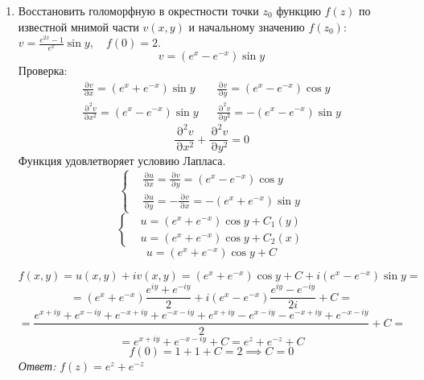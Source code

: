 \documentclass[14pt, a4paper, titlepage, fleqn]{extarticle}
\newcommand{\otv}{\textit{Ответ:} }
\DeclareMathOperator{\D}{\partial}
\begin{document}
\begin{enumerate}
        \item Восстановить голоморфную в окрестности точки \( z_0 \) функцию \( f(z) \) по известной
        мнимой части \( v(x,y) \) и начальному значению \( f(z_0) \): 
        \( 
            \displaystyle
            v = \frac{e^{2x}-1}{e^x}\sin{y}, \quad f(0) = 2
        \).
        \[ v = \left( e^x - e^{-x} \right) \sin y \]
        Проверка:
        \[
            \begin{matrix}
                \frac{\D v}{\D x} = \left( e^{x} + e^{-x} \right) \sin y &&
                \frac{\D v}{\D y} = \left( e^{x} - e^{-x} \right) \cos y \\
                \frac{\D^2 v}{\D x^2} = \left( e^{x} - e^{-x} \right) \sin y && 
                \frac{\D^2 v}{\D y^2} = -\left( e^{x} - e^{-x} \right) \sin y
            \end{matrix}
        \]
        \[
            \frac{\D^2 v}{\D x^2} + \frac{\D^2 v}{\D y^2} = 0
        \]
        Функция удовлетворяет условию Лапласа. 
        \[
            \left\lbrace
            \begin{aligned}
                &\frac{\D u}{\D x} = \frac{\D v}{\D y} = \left( e^{x} - e^{-x} \right) \cos y \\
                &\frac{\D u}{\D y} = -\frac{\D v}{\D x} = - \left( e^{x} + e^{-x} \right) \sin y
            \end{aligned}   
            \right.
        \]
        \[
            \left\lbrace
            \begin{aligned}
                &u = \left( e^{x} + e^{-x} \right) \cos y + C_1(y) \\
                &u = \left( e^{x} + e^{-x} \right) \cos y + C_2(x)
            \end{aligned}   
            \right.
        \]
        \[
            u = \left( e^{x} + e^{-x} \right) \cos y + C
        \]

        \[
            f(x,y) = u(x,y) + i v(x,y) = \left( e^{x} + e^{-x} \right) \cos y + C + i \left( e^x - e^{-x} \right) \sin y =
        \]
        \[
            =  \left( e^{x} + e^{-x} \right) \frac{e^{iy} + e^{-iy}}{2} + i \left( e^x - e^{-x} \right) \frac{e^{iy} - e^{-iy}}{2i} + C =
        \]
        \[
            = \frac{e^{x+iy} +e^{x-iy} + e^{-x+iy} + e^{-x-iy} + e^{x+iy} -e^{x-iy} - e^{-x+iy} + e^{-x-iy} }{2} + C =
        \]
        \[
            = e^{x+iy} + e^{-x-iy} + C = e^z + e^{-z} + C
        \]
        \[
            f(0) = 1 + 1 + C = 2 \implies C = 0
        \]
        \otv \( f(z) = e^z + e^{-z} \)


\end{enumerate}
\end{document}
